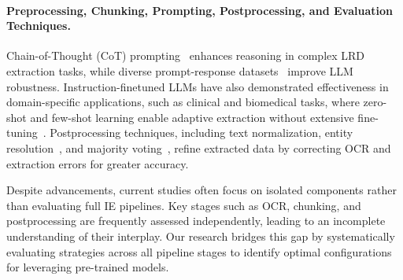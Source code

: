 \paragraph{Preprocessing, Chunking, Prompting, Postprocessing, and Evaluation Techniques.} Chain-of-Thought (CoT) prompting~\cite{wei2022cot} enhances reasoning in complex LRD extraction tasks, while diverse prompt-response datasets~\cite{zmigrod-etal-2024-value} improve LLM robustness. Instruction-finetuned LLMs have also demonstrated effectiveness in domain-specific applications, such as clinical and biomedical tasks, where zero-shot and few-shot learning enable adaptive extraction without extensive fine-tuning~\cite{labrak-etal-2024-zero}. Postprocessing techniques, including text normalization, entity resolution~\cite{hwang2021entityresolution}, and majority voting~\cite{wang2022majority}, refine extracted data by correcting OCR and extraction errors for greater accuracy.

Despite advancements, current studies often focus on isolated components rather than evaluating full IE pipelines. Key stages such as OCR, chunking, and postprocessing are frequently assessed independently, leading to an incomplete understanding of their interplay. Our research bridges this gap by systematically evaluating strategies across all pipeline stages to identify optimal configurations for leveraging pre-trained models.